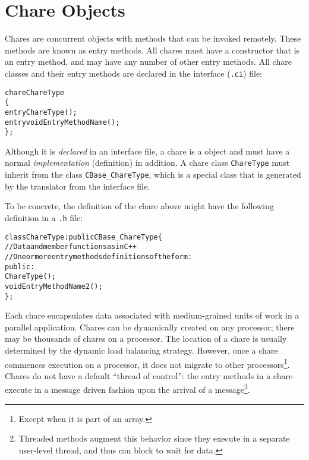 \section{Chare Objects}

Chares are concurrent objects with methods that can be invoked
remotely. These methods are known as entry methods. All
chares must have a constructor that is an entry method, and may have any
number of other entry methods. All chare classes and their entry methods are
declared in the interface (\texttt{.ci}) file:

\begin{alltt}
chare ChareType
\{
    entry ChareType();
    entry void EntryMethodName();
\};
\end{alltt}

Although it is {\em declared} in an interface file, a chare is a \CC{} object and must
have a normal \CC{} {\em implementation} (definition) in addition. A chare
class {\tt ChareType} must inherit from the class {\tt CBase\_ChareType}, which
is a special class that is generated by the \charmpp translator from the
interface file.

To be concrete, the \CC{} definition of the chare above might have 
the following definition in a \texttt{.h} file:

\begin{alltt}
   class ChareType : public CBase\_ChareType \{
       // Data and member functions as in C++
       // One or more entry methods definitions of the form:
       public:
           ChareType();
           void EntryMethodName2();
   \};
\end{alltt}

Each chare encapsulates data associated with medium-grained units of work in a
parallel application.
Chares can be dynamically created on any processor; there may
be thousands of chares on a processor. The location of a chare is
usually determined by the dynamic load balancing strategy. However,
once a chare commences execution on a processor, it does not migrate
to other processors\footnote{Except when it is part of an array.}.  
Chares do not have a default ``thread of
control'': the entry methods  in a
chare execute in a message driven fashion upon the arrival of a 
message\footnote{Threaded methods augment this behavior since they execute in
a separate user-level thread, and thus can block to wait for data.}.

